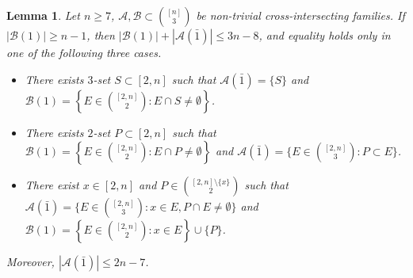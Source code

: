 \documentclass[10pt,a4paper]{amsart}
\newtheorem{lemma}{Lemma}
\newcommand{\m}{\mathcal}
\begin{document}
\begin{lemma}\label{end2}
Let $n\ge 7$, $\m A, \m B \subset {[n]\choose 3}$ be non-trivial cross-intersecting families. 
If $|\m B(1)|\ge n-1$, then $|\m B(1)|+|\m A(\bar1)|\le 3n-8$, and equality holds only in one of the following three cases.
\begin{itemize}
\item[\rm (i)]
There exists $3$-set $S\subset [2,n]$ such that
$\m A(\bar1)=\{S\}$ and 
$\m B(1)=\left\{E\in\binom{[2,n]}{2}:E\cap S\ne\emptyset\right\}$.
\item[\rm (ii)]
There exists $2$-set $P\subset [2,n]$ such that $\m B(1)=\left\{E\in\binom{[2,n]}{2}:E\cap P\ne\emptyset\right\}$ and
$\m A(\bar1)=\{E\in \binom{[2,n]}{3}:P\subset E\}$.
\item[\rm (iii)]
There exist $x\in [2,n]$ and $P\in\binom{[2,n]\setminus\{x\}}2$ such that
$\m A(\bar1)=\{E\in \binom{[2,n]}{3}:x\in E, P\cap E\ne\emptyset\}$ and 
$\m B(1)=\left\{E\in\binom{[2,n]}{2}:x\in E\right\}\cup\{P\}$.
\end{itemize}
Moreover, $|\m A(\bar1)|\le 2n-7$. 
\end{lemma}
\end{document}
